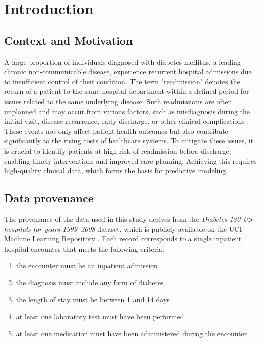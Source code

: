 \section{Introduction}

\subsection{Context and Motivation}
A large proportion of individuals diagnosed with diabetes mellitus, a leading chronic non-communicable disease, experience recurrent hospital admissions due to insufficient control of their condition. The term "readmission" denotes the return of a patient to the same hospital department within a defined period for issues related to the same underlying disease. Such readmissions are often unplanned and may occur from various factors, such as misdiagnosis during the initial visit, disease recurrence, early discharge, or other clinical complications \cite{dungan2012effect, eby2014predictors}. These events not only affect patient health outcomes but also contribute significantly to the rising costs of healthcare systems. To mitigate these issues, it is crucial to identify patients at high risk of readmission before discharge, enabling timely interventions and improved care planning. Achieving this requires high-quality clinical data, which forms the basis for predictive modeling.


\subsection{Data provenance}
The provenance of the data used in this study derives from the \textit{Diabetes 130-US hospitals for years 1999–2008} dataset, which is publicly available on the UCI Machine Learning Repository \cite{uciml}. Each record corresponds to a single inpatient hospital encounter that meets the following criteria: 
\begin{enumerate}
    \item the encounter must be an inpatient admission
    \item the diagnosis must include any form of diabetes
    \item the length of stay must be between 1 and 14 days
    \item at least one laboratory test must have been performed
    \item at least one medication must have been administered during the encounter
\end{enumerate}

